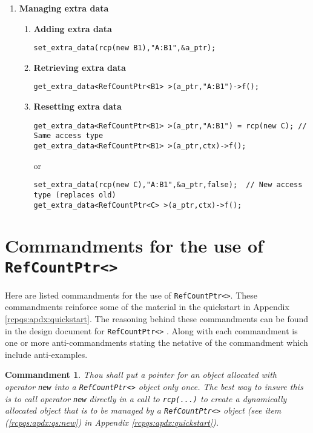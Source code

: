 \documentclass[pdf,ps2pdf,11pt]{SANDreport}
\newtheorem{commandment}{Commandment}
\begin{document}
\begin{enumerate}
\item {\bf Managing extra data}
\label{rcpqs:apdx:qs:extra-data}
%
\begin{enumerate}
%
\item {\bf Adding extra data}
%
{\small\begin{verbatim}
set_extra_data(rcp(new B1),"A:B1",&a_ptr);
\end{verbatim}}
%
\item {\bf Retrieving extra data}
%
{\small\begin{verbatim}
get_extra_data<RefCountPtr<B1> >(a_ptr,"A:B1")->f();
\end{verbatim}}
%
\item {\bf Resetting extra data}
%
{\small\begin{verbatim}
get_extra_data<RefCountPtr<B1> >(a_ptr,"A:B1") = rcp(new C); // Same access type
get_extra_data<RefCountPtr<B1> >(a_ptr,ctx)->f();
\end{verbatim}}
or
{\small\begin{verbatim}
set_extra_data(rcp(new C),"A:B1",&a_ptr,false);  // New access type (replaces old)
get_extra_data<RefCountPtr<C> >(a_ptr,ctx)->f();
\end{verbatim}}
%
\end{enumerate}

\end{enumerate}

%
\section{Commandments for the use of {}\texttt{Ref\-Count\-Ptr<>}}
\label{rcpqs:apdx:commandments}
%

Here are listed commandments for the use of
{}\texttt{Ref\-Count\-Ptr<>}.  These commandments reinforce some of
the material in the quickstart in Appendix
{}\ref{rcpqs:apdx:quickstart}.  The reasoning behind these
commandments can be found in the design document for
{}\texttt{Ref\-Count\-Ptr<>} {}\cite{ref:RefCountPtr}.  Along with
each commandment is one or more anti-commandments stating the netative
of the commandment which include anti-examples.

\begin{commandment}\label{rcp:cmd:rcp-new}
Thou shall put a pointer for an object allocated with operator
{}\texttt{new} into a {}\texttt{Ref\-Count\-Ptr<>} object only once.
The best way to insure this is to call operator {}\texttt{new}
directly in a call to {}\texttt{rcp(...)} to create a dynamically
allocated object that is to be managed by a
{}\texttt{Ref\-Count\-Ptr<>} object (see item
({}\ref{rcpqs:apdx:qs:new}) in Appendix
{}\ref{rcpqs:apdx:quickstart}).
\end{commandment}
\end{document}
